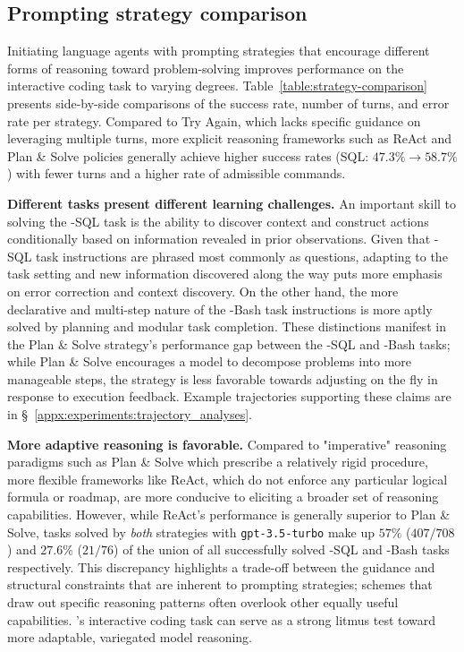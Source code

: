 \subsection{Prompting strategy comparison}
\label{sec:experiments:strategy_compare}
Initiating language agents with prompting strategies that encourage different forms of reasoning toward problem-solving improves performance on the interactive coding task to varying degrees. Table~\ref{table:strategy-comparison} presents side-by-side comparisons of the success rate, number of turns, and error rate per strategy. 
Compared to Try Again, which lacks specific guidance on leveraging multiple turns, more explicit reasoning frameworks such as ReAct and Plan \& Solve policies generally achieve higher success rates (SQL: $47.3\% \rightarrow 58.7\%$) with fewer turns and a higher rate of admissible commands.




\textbf{Different tasks present different learning challenges.}
An important skill to solving the \benchmark{}-SQL task is the ability to discover context and construct actions conditionally based on information revealed in prior observations.
Given that \benchmark{}-SQL task instructions are phrased most commonly as questions, adapting to the task setting and new information discovered along the way puts more emphasis on error correction and context discovery.
On the other hand, the more declarative and multi-step nature of the \benchmark{}-Bash task instructions is more aptly solved by planning and modular task completion.
These distinctions manifest in the Plan \& Solve strategy's performance gap between the \benchmark{}-SQL and \benchmark{}-Bash tasks; while Plan \& Solve encourages a model to decompose problems into more manageable steps, the strategy is less favorable towards adjusting on the fly in response to execution feedback.
Example trajectories supporting these claims are in \S~\ref{appx:experiments:trajectory_analyses}.

\textbf{More adaptive reasoning is favorable.}
Compared to "imperative" reasoning paradigms such as Plan \& Solve which prescribe a relatively rigid procedure, more flexible frameworks like ReAct, which do not enforce any particular logical formula or roadmap, are more conducive to eliciting a broader set of reasoning capabilities.
However, while ReAct's performance is generally superior to Plan \& Solve, tasks solved by \textit{both} strategies with \texttt{gpt-3.5-turbo} make up $57\%$ ($407/708$) and $27.6\%$ ($21/76$) of the union of all successfully solved \benchmark{}-SQL and \benchmark{}-Bash tasks respectively.
This discrepancy highlights a trade-off between the guidance and structural constraints that are inherent to prompting strategies; schemes that draw out specific reasoning patterns often overlook other equally useful capabilities.
\benchmark{}'s interactive coding task can serve as a strong litmus test toward more adaptable, variegated model reasoning.

